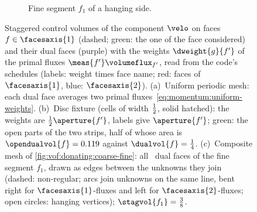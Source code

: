 \begin{figure}
\begin{subfigure}[b]{0.535\textwidth}
\begin{tikzpicture}[x=2.0cm,y=2.0cm]
    \end{tikzpicture}
    \caption{Fine segment $f_1$ of a hanging side.}
    \label{fig:momentum:dual:coarse-fine}
  \end{subfigure}
  \caption{Staggered control volumes of the component $\velo$ on faces
    $f\in\facesaxis{1}$ (dashed; green: the one of the face considered) and
    their dual faces (purple) with the weights $\dweight{g}{f'}$ of the
    primal fluxes $\meas{f'}\volumeflux_{f'}$, read from the code's schedules
    (labels: weight times face name; red: faces of $\facesaxis{1}$, blue:
    $\facesaxis{2}$). (a)~Uniform periodic mesh: each dual face averages two
    primal fluxes~\cref{eq:momentum:uniform-weights}. (b)~Disc fixture (cells
    of width $\frac{1}{2}$, solid hatched): the weights are $\half\aperture{f'}$,
    labels give $\aperture{f'}$; green: the open parts of the two strips, half
    of whose area is $\opendualvol{f}=\chkMomCutOpenDual$ against
    $\dualvol{f}=\chkMomCutUncutDual$. (c)~Composite mesh of
    \cref{fig:vof:donating:coarse-fine}: all \chkMomCoarseLinks\ dual faces of the
    fine segment $f_1$, drawn as edges between the unknowns they join
    (dashed: non-regular; arcs join unknowns on the same line, bent right for
    $\facesaxis{1}$-fluxes and left for $\facesaxis{2}$-fluxes; open circles:
    hanging vertices); $\stagvol{f_1}=\chkMomCoarseVolume$.}
  \label{fig:momentum:dual}
\end{figure}
